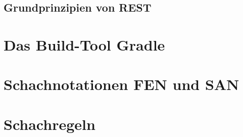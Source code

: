 \subsection{Grundprinzipien von REST}


\section{Das Build-Tool Gradle}

\section{Schachnotationen FEN und SAN}

\section{Schachregeln}